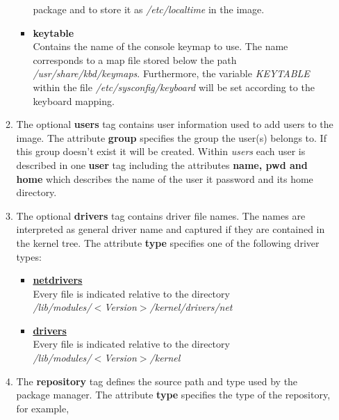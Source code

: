 \begin{itemize}
\begin{enumerate}
\begin{itemize}
                    package and to store it as \textit{/etc/localtime} in the
                    image.
              \item \textbf{keytable}\\
                    Contains the name of the console keymap to use. The name
                    corresponds to a map file stored below the path
                    \textit{/usr/share/kbd/keymaps}. Furthermore, the variable
                    \textit{KEYTABLE} within the file
                    \textit{/etc/sysconfig/keyboard} will be set according
                    to the keyboard mapping.
          \end{itemize}
          \item The optional \textbf{users} tag contains user information
                used to add users to the image. The attribute \textbf{group}
                specifies the group the user(s) belongs to. If this group
                doesn't exist it will be created. Within \textit{users}
                each user is described in one \textbf{user} tag including the
                attributes \textbf{name, pwd and home} which describes the
                name of the user it password and its home directory.
          \item The optional \textbf{drivers} tag contains driver file names.
                The names are interpreted as general driver name and captured
                if they are contained in the kernel tree. The attribute
                \textbf{type} specifies one of the following driver types:
                \begin{itemize}
                \item \textbf{\underline{netdrivers}}\\
                      Every file is indicated relative to the directory\\
                      \textit{/lib/modules/$<$Version$>$/kernel/drivers/net}
                \item \textbf{\underline{drivers}}\\
                      Every file is indicated relative to the directory\\
                      \textit{/lib/modules/$<$Version$>$/kernel}
                \end{itemize}
          \item The \textbf{repository} tag defines the source path and
                type used by the package manager. The attribute
                \textbf{type} specifies the
                type of the repository, for example,

\end{enumerate}
\end{itemize}
